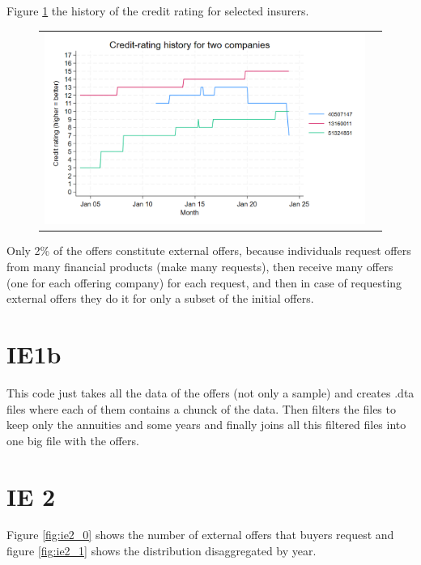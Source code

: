 \documentclass[12pt]{article}
\begin{document}
Figure \ref{fig:ie1_1} the history of the credit rating for selected insurers.  
\begin{figure}[H]
\caption{}
 \label{fig:ie1_1}
\centering{}%
\begin{tabular}{cc}
\includegraphics[scale=0.27]{figures/IE1_credit_history.png}
\end{tabular}
\end{figure}

Only 2\% of the offers constitute external offers, because individuals request offers from many financial products (make many requests), then receive many offers (one for each offering company) for each request, and then in case of requesting external offers they do it for only a subset of the initial offers. 

\section{IE1b}

This code just takes all the data of the offers (not only a sample) and creates .dta files where each of them contains a chunck of the data. Then filters the files to keep only the annuities and some years and finally joins all this filtered files into one big file with the offers. 


\section{IE 2}

Figure \ref{fig:ie2_0} shows the number of external offers that buyers request and figure \ref{fig:ie2_1} shows the distribution disaggregated by year. 
\end{document}
